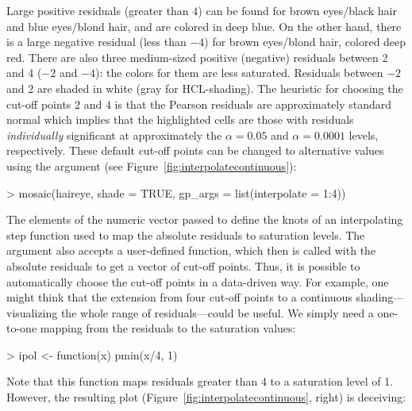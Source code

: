 \documentclass{Z}
\newcommand{\codefun}[1]{\code{#1()}}
\begin{document}

\noindent Large positive residuals (greater than $4$) can be found for
brown eyes/black hair and blue eyes/blond hair, and are colored in deep blue. 
On the other hand, there is a large negative residual
(less than $-4$) for brown eyes/blond hair, colored deep red. There are also three
medium-sized positive (negative) residuals between 2 and 4 ($-2$ and
$-4$): the colors for them are less saturated. Residuals between $-2$ and $2$ 
are shaded in white (gray for HCL-shading).
The heuristic for choosing the cut-off points $2$ and $4$ is that the Pearson residuals
are approximately standard normal which implies that the highlighted cells are those with
residuals \emph{individually} significant at approximately the $\alpha
= 0.05$ and $\alpha = 0.0001$ levels, respectively. These default cut-off points can
be changed to alternative values using the 
argument (see Figure~\ref{fig:interpolatecontinuous}):

\begin{Schunk}
\begin{Sinput}
> mosaic(haireye, shade = TRUE, gp_args = list(interpolate = 1:4))
\end{Sinput}
\end{Schunk}

\noindent The elements of the numeric vector passed to
 define the knots of an interpolating step function
used to map the absolute residuals to saturation levels. 
The  argument also accepts a user-defined function,
which then is called with the absolute residuals to get a vector of
cut-off points. Thus, it is possible to automatically choose the cut-off points 
in a data-driven way. For example,
one might think that the extension from four cut-off points 
to a continuous shading---visualizing the whole range of 
residuals---could be useful. We simply need a one-to-one
mapping from the residuals to the saturation values: 

\begin{Schunk}
\begin{Sinput}
> ipol <- function(x) pmin(x/4, 1)
\end{Sinput}
\end{Schunk}

\noindent Note that this \codefun{ipol} 
function maps residuals greater than 4 to a saturation
level of 1. However, the resulting plot
(Figure~\ref{fig:interpolatecontinuous}, right) is 
deceiving: 
\end{document}
